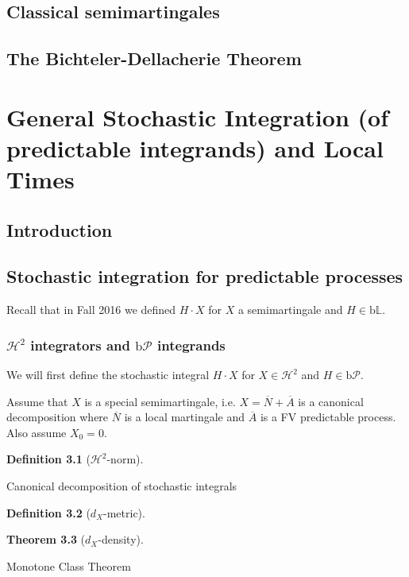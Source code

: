 \documentclass[openany,oneside]{book}
\newtheorem{thm}{Theorem}[section]
\theoremstyle{definition}
\newtheorem{defn}[thm]{Definition}
\theoremstyle{remark}
\newcommand{\sH}[1][2]{\mathcal{H}^{#1}} %
\newcommand{\pred}{\mathcal{P}} %
\newcommand{\bP}{\mathrm{b}\pred} %
\renewcommand{\L}{\mathbb{L}} %
\newcommand{\bL}{\mathrm{b}\L} %
\begin{document}
\section{Classical semimartingales}

\section{The Bichteler-Dellacherie Theorem}


\chapter{General Stochastic Integration (of predictable integrands) and Local Times}

\section{Introduction}

\section{Stochastic integration for predictable processes}
Recall that in Fall 2016 we defined $H\cdot X$ for $X$ a semimartingale and $H\in \bL$.

\subsection{$\sH$ integrators and $\bP$ integrands}
We will first define the stochastic integral $H\cdot X$ for $X\in \sH$ and $H\in \bP$.

\par
Assume that $X$ is a special semimartingale, i.e. $X=\overline{N}+\overline{A}$ is a canonical decomposition where $\overline{N}$ is a local martingale and $\overline{A}$ is a FV predictable process. Also assume $X_0=0$.

\begin{defn}[$\sH$-norm]

\end{defn}

Canonical decomposition of stochastic integrals

\begin{defn}[$d_X$-metric]

\end{defn}

\begin{thm}[$d_X$-density]

\end{thm}
Monotone Class Theorem
\end{document}
